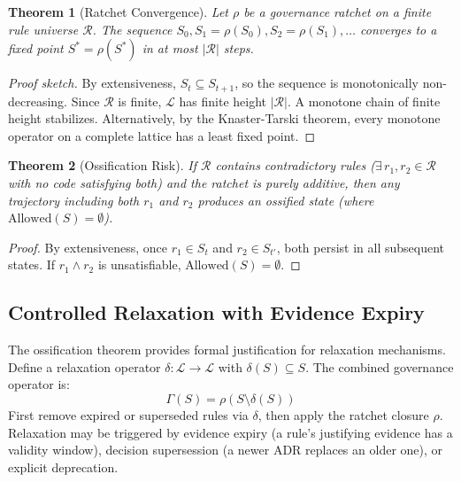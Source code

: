 \documentclass[11pt, a4paper, logo, copyright]{googledeepmind}
\newtheorem{theorem}{Theorem}[section]
\begin{document}
\begin{theorem}[Ratchet Convergence]
\label{thm:ratchet-convergence}
Let $\rho$ be a governance ratchet on a finite rule universe $\mathcal{R}$. The sequence $S_0, S_1 = \rho(S_0), S_2 = \rho(S_1), \ldots$ converges to a fixed point $S^* = \rho(S^*)$ in at most $|\mathcal{R}|$ steps.
\end{theorem}

\begin{proof}[Proof sketch]
By extensiveness, $S_t \subseteq S_{t+1}$, so the sequence is monotonically non-decreasing. Since $\mathcal{R}$ is finite, $\mathcal{L}$ has finite height $|\mathcal{R}|$. A monotone chain of finite height stabilizes. Alternatively, by the Knaster-Tarski theorem, every monotone operator on a complete lattice has a least fixed point.
\end{proof}

\begin{theorem}[Ossification Risk]
\label{thm:ossification}
If $\mathcal{R}$ contains contradictory rules ($\exists\, r_1, r_2 \in \mathcal{R}$ with no code satisfying both) and the ratchet is purely additive, then any trajectory including both $r_1$ and $r_2$ produces an ossified state (where $\mathrm{Allowed}(S) = \emptyset$).
\end{theorem}

\begin{proof}
By extensiveness, once $r_1 \in S_t$ and $r_2 \in S_{t'}$, both persist in all subsequent states. If $r_1 \wedge r_2$ is unsatisfiable, $\mathrm{Allowed}(S) = \emptyset$.
\end{proof}

\subsection{Controlled Relaxation with Evidence Expiry}

The ossification theorem provides formal justification for relaxation mechanisms. Define a relaxation operator $\delta: \mathcal{L} \to \mathcal{L}$ with $\delta(S) \subseteq S$. The combined governance operator is:
\begin{equation}
    \Gamma(S) = \rho(S \setminus \delta(S))
\end{equation}
First remove expired or superseded rules via $\delta$, then apply the ratchet closure $\rho$. Relaxation may be triggered by evidence expiry (a rule's justifying evidence has a validity window), decision supersession (a newer ADR replaces an older one), or explicit deprecation.
\end{document}
